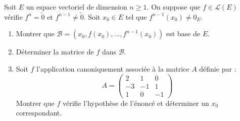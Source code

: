 \documentclass[a4paper,10pt]{report}
\begin{document}
\begin{Exercice}{} Soit $E$ un espace vectoriel de dimension $n \geq 1$. On suppose que $f \in \mathcal{L}(E)$ vérifie $f^n = \tilde{0}$ et $f^{n-1} \neq \tilde{0}$. Soit $x_0 \in E$ tel que $f^{n-1}(x_0) \neq 0_E$.

\begin{enumerate}
\item Montrer que $\mathcal{B}= (x_0, f(x_0), \ldots, f^{n-1}(x_0))$ est base de $E$. 
\item Déterminer la matrice de $f$ dans $\mathcal{B}$.
\item Soit $f$ l'application canoniquement associée à la matrice $A$ définie par :
$$ A = \begin{pmatrix}
2 & 1 & 0 \\
-3 & -1 & 1 \\
1 & 0 & -1 
\end{pmatrix}$$
Montrer que $f$ vérifie l'hypothèse de l'énoncé et déterminer un $x_0$ correspondant.
\end{enumerate}
\end{Exercice}

\corr 
\end{document}
